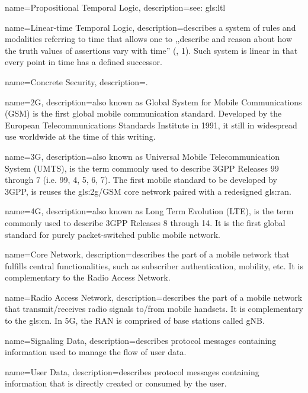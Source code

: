 {
    name={Propositional Temporal Logic},
    description={see: \gls{gls:ltl}}
}

{
    name={Linear-time Temporal Logic},
    description={describes a system of rules and modalities referring to time that allows one to ,,describe and reason about how the truth values of assertions vary
with time'' (\cite{emerson1990temporal}, 1). Such system is linear in that every point in time has a defined successor.}
}

{
    name={Concrete Security},
    description={.}
}

{
    name={2G},
    description={also known as Global System for Mobile Communications (GSM) is the first global mobile communication standard. Developed by the European Telecommunications Standards Institute in 1991, it still in widespread use worldwide at the time of this writing.}
}

{
    name={3G},
    description={also known as Universal Mobile Telecommunication System (UMTS), is the term commonly used to describe 3GPP Releases 99 through 7 (i.e. 99, 4, 5, 6, 7). The first mobile standard to be developed by 3GPP, is reuses the \gls{gls:2g}/GSM core network paired with a redesigned \gls{gls:ran}.}
}

{
    name={4G},
    description={also known as Long Term Evolution (LTE), is the term commonly used to describe 3GPP Releases 8 through 14. It is the first global standard for purely packet-switched public mobile network.}
}

{
    name={Core Network},
    description={describes the part of a mobile network that fulfills central functionalities, such as subscriber authentication, mobility, etc. It is complementary to the Radio Access Network.}
}

{
    name={Radio Access Network},
    description={describes the part of a mobile network that transmit/receives radio signals to/from mobile handsets. It is complementary to the \gls{gls:cn}. In 5G, the RAN is comprised of base stations called gNB.}
}

{
    name={Signaling Data},
    description={describes protocol messages containing information used to manage the flow of user data.}
}

{
    name={User Data},
    description={describes protocol messages containing information that is directly created or consumed by the user.}
}
